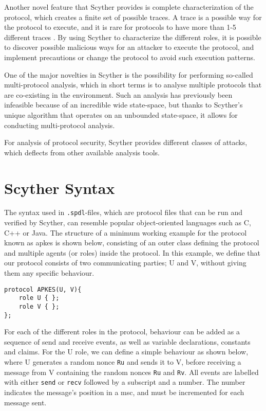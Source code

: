 Another novel feature that Scyther provides is complete characterization of the protocol, which creates a finite set of possible traces. A trace is a possible way for the protocol to execute, and it is rare for protocols to have more than 1-5 different traces \cite{cremers2008scyther}. By using Scyther to characterize the different roles, it is possible to discover possible malicious ways for an attacker to execute the protocol, and implement precautions or change the protocol to avoid such execution patterns.


One of the major novelties in Scyther is the possibility for performing so-called multi-protocol analysis, which in short terms is to analyse multiple protocols that are co-existing in the environment. Such an analysis has previously been infeasible because of an incredible wide state-space, but thanks to Scyther's unique algorithm that operates on an unbounded state-space, it allows for conducting multi-protocol analysis. 



For analysis of protocol security, Scyther provides different classes of attacks, which deflects from other available analysis tools.


\section{Scyther Syntax}


The syntax used in \verb!.spdl!-files, which are protocol files that can be run and verified by Scyther, can resemble popular object-oriented languages such as C, C++ or Java. The structure of a minimum working example for the protocol known as \gls{apkes} is shown below, consisting of an outer class defining the protocol and multiple agents (or roles) inside the protocol. In this example, we define that our protocol consists of two communicating parties; U and V, without giving them any specific behaviour.\newline

\begin{lstlisting}
protocol APKES(U, V){
	role U { };
	role V { };  
};
\end{lstlisting}

For each of the different roles in the protocol, behaviour can be added as a sequence of send and receive events, as well as variable declarations, constants and claims. For the U role, we can define a simple behaviour as shown below, where U generates a random nonce \texttt{Ru} and sends it to V, before receiving a message from V containing the random nonces \texttt{Ru} and \texttt{Rv}. All events are labelled with either \texttt{send} or \texttt{recv} followed by a subscript and a number. The number indicates the message's position in a \gls{msc}, and must be incremented for each message sent.\newline

